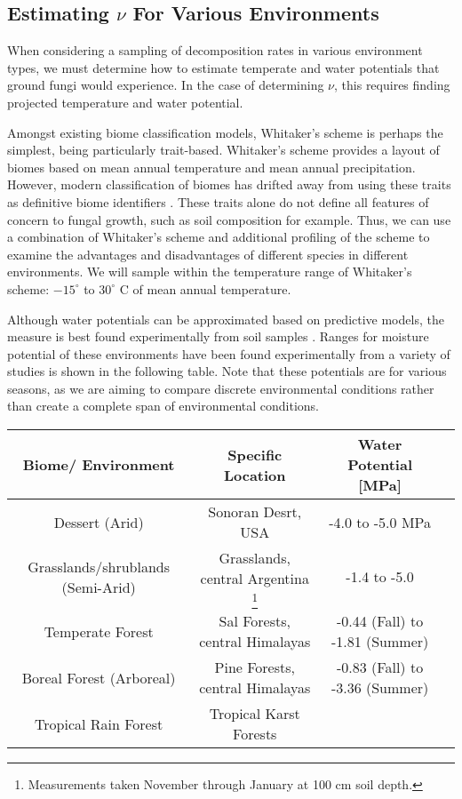 \documentclass{article}
\begin{document}
\subsection{Estimating $\nu$ For Various Environments}

When considering a sampling of decomposition rates in various environment types, we must determine how to estimate temperate and water potentials that ground fungi would experience. In the case of determining $\nu$, this requires finding projected temperature and water potential.

Amongst existing biome classification models, Whitaker's scheme \cite{Whittaker1970} is perhaps the simplest, being particularly trait-based. Whitaker's scheme provides a layout of biomes based on mean annual temperature and mean annual precipitation. However, modern classification of biomes has drifted away from using these traits as definitive biome identifiers \cite{Mucina2018}. These traits alone do not define all features of concern to fungal growth, such as soil composition for example. Thus, we can use a combination of Whitaker's scheme and additional profiling of the scheme to examine the advantages and disadvantages of different species in different environments. We will sample within the temperature range of Whitaker's scheme: $-15^{\circ}$ to $30^{\circ}$ C of mean annual temperature.

 Although water potentials can be approximated based on predictive models, the measure is best found experimentally from soil samples \cite{Abkenar2019}. Ranges for moisture potential of these environments have been found experimentally from a variety of studies is shown in the following table. Note that these potentials are for various seasons, as we are aiming to compare discrete environmental conditions rather than create a complete span of environmental conditions.

\begin{savenotes}
\begin{table}[ht]
\begin{center}
 \begin{tabular}{|c c c c|} 
 \hline
 Biome/ Environment & Specific Location & Water Potential [MPa] \\ [0.5ex] 
 \hline\hline
 Dessert (Arid) & Sonoran Desrt, USA & -4.0 to -5.0 MPa \cite{Nilsen1983} \\ 
 \hline
 Grasslands/shrublands (Semi-Arid) & Grasslands, central Argentina \footnote{Measurements taken November through January at 100 cm soil depth.} & -1.4 to -5.0 \cite{Pelaez 1994}\\
 \hline
 Temperate Forest & Sal Forests, central Himalayas & -0.44 (Fall) to -1.81 (Summer) \cite{Zobel2001} \\
 \hline
 Boreal Forest (Arboreal) & Pine Forests, central Himalayas & -0.83 (Fall) to -3.36 (Summer) \cite{Zobel2001}\\
 \hline
 Tropical Rain Forest & Tropical Karst Forests &  \\ [1ex] 
 \hline
\end{tabular}
\end{center}
\end{table}
\end{savenotes}
\end{document}

